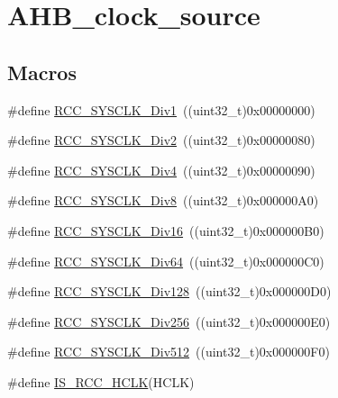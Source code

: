 \hypertarget{group___a_h_b__clock__source}{}\section{A\+H\+B\+\_\+clock\+\_\+source}
\label{group___a_h_b__clock__source}
\subsection*{Macros}
\begin{DoxyCompactItemize}
\item 
\#define \mbox{\hyperlink{group___a_h_b__clock__source_gadc3ac37d90c2082d640e5948fac0878f}{R\+C\+C\+\_\+\+S\+Y\+S\+C\+L\+K\+\_\+\+Div1}}~((uint32\+\_\+t)0x00000000)
\item 
\#define \mbox{\hyperlink{group___a_h_b__clock__source_gacadd82156776154a07d128b454fc69fd}{R\+C\+C\+\_\+\+S\+Y\+S\+C\+L\+K\+\_\+\+Div2}}~((uint32\+\_\+t)0x00000080)
\item 
\#define \mbox{\hyperlink{group___a_h_b__clock__source_ga458f8ae63164e878930dbebd7643f087}{R\+C\+C\+\_\+\+S\+Y\+S\+C\+L\+K\+\_\+\+Div4}}~((uint32\+\_\+t)0x00000090)
\item 
\#define \mbox{\hyperlink{group___a_h_b__clock__source_gade72fe3aca89f3e8c4fe8692ea217912}{R\+C\+C\+\_\+\+S\+Y\+S\+C\+L\+K\+\_\+\+Div8}}~((uint32\+\_\+t)0x000000\+A0)
\item 
\#define \mbox{\hyperlink{group___a_h_b__clock__source_gaefd8df4be9c9dbd9cebfb2384933500a}{R\+C\+C\+\_\+\+S\+Y\+S\+C\+L\+K\+\_\+\+Div16}}~((uint32\+\_\+t)0x000000\+B0)
\item 
\#define \mbox{\hyperlink{group___a_h_b__clock__source_gab6a2c2d4e945c607259988a9b6df26e5}{R\+C\+C\+\_\+\+S\+Y\+S\+C\+L\+K\+\_\+\+Div64}}~((uint32\+\_\+t)0x000000\+C0)
\item 
\#define \mbox{\hyperlink{group___a_h_b__clock__source_ga1a28926fcb86112058a365e01fe9a46b}{R\+C\+C\+\_\+\+S\+Y\+S\+C\+L\+K\+\_\+\+Div128}}~((uint32\+\_\+t)0x000000\+D0)
\item 
\#define \mbox{\hyperlink{group___a_h_b__clock__source_gaa28bb876893b3267a813fc98a462d5ee}{R\+C\+C\+\_\+\+S\+Y\+S\+C\+L\+K\+\_\+\+Div256}}~((uint32\+\_\+t)0x000000\+E0)
\item 
\#define \mbox{\hyperlink{group___a_h_b__clock__source_gab5b4588c455d6327bc96f131ed6698ab}{R\+C\+C\+\_\+\+S\+Y\+S\+C\+L\+K\+\_\+\+Div512}}~((uint32\+\_\+t)0x000000\+F0)
\item 
\#define \mbox{\hyperlink{group___a_h_b__clock__source_ga6e9f1c193a2f41bcb3c2f7fa8459b5b3}{I\+S\+\_\+\+R\+C\+C\+\_\+\+H\+C\+LK}}(H\+C\+LK)
\end{DoxyCompactItemize}


